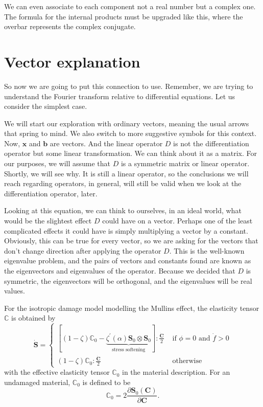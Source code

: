 \documentclass{article}
\newcounter{problem}[section]\setcounter{problem}{1}
\begin{document}
We can even associate to each component not a real number but a complex one.
The formula for the internal products must be upgraded like this, where the overbar represents the complex conjugate.


\section{Vector explanation}

So now we are going to put this connection to use.
Remember, we are trying to understand the Fourier transform relative to differential equations.
Let us consider the simplest case.

We will start our exploration with ordinary vectors, meaning the usual arrows that spring to mind.
We also switch to more suggestive symbols for this context.
Now, \(\bm x\) and \(\bm b\) are vectors.
And the linear operator \(D\) is not the differentiation operator but some linear transformation.
We can think about it as a matrix.
For our purposes, we will assume that \(D\) is a symmetric matrix or linear operator.
Shortly, we will see why.
It is still a linear operator, so the conclusions we will reach regarding operators, in general, will still be valid when we look at the differentiation operator, later.

Looking at this equation, we can think to ourselves, in an ideal world, what would be the slightest effect $D$ could have on a vector.
Perhaps one of the least complicated effects it could have is simply multiplying a vector by a constant.
Obviously, this can be true for every vector, so we are asking for the vectors that don't change direction after applying the operator $D$.
This is the well-known eigenvalue problem, and the pairs of vectors and constants found are known as the eigenvectors and eigenvalues of the operator.
Because we decided that $D$ is symmetric, the eigenvectors will be orthogonal, and the eigenvalues will be real values.

For the isotropic damage model modelling the Mullins effect, the elasticity tensor \(\mathbb C\) is obtained by
 \[
\dot{\mathbf{S} }=
\begin{cases}
\left[(1-\zeta) \mathbb{C}_{0}- \underbrace{\zeta^{\prime}(\alpha) \mathbf{S}_{0} \otimes \mathbf{S}_{0} }_{\text{stress softening} }\right]: \frac{\dot{\mathbf{C} } }{2}  & \text { if } \phi=0 \text { and } \dot{f}>0 \\
(1-\zeta) \mathbb{C}_{0}: \frac{\dot{\mathbf{C} } }{2} & \text { otherwise }
\end{cases}
\]
with the effective elasticity tensor \(\mathbb{C}_{0}\) in the material description. For an undamaged material, \(\mathbb{C}_{0}\) is defined to be
\[
\mathbb{C}_{0}=2 \frac{\partial \mathbf{S}_{0}(\mathbf{C})}{\partial \mathbf{C} }.
\]
\end{document}
